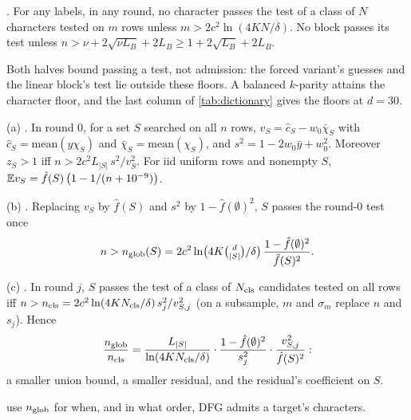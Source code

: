 \begin{proposition}\label{prop:floor}
. For any labels, in any round, no character passes the test of a class of $N$ characters tested on $m$ rows unless $m>2c^2\ln(4KN/\delta)$. No block passes its test unless $n>\nu+2\sqrt{\nu L_B}+2L_B\ge1+2\sqrt{L_B}+2L_B$.
\end{proposition}
Both halves bound passing a test, not admission: the forced variant's guesses and the linear block's test lie outside these floors. A balanced $k$-parity attains the character floor, and the last column of \cref{tab:dictionary} gives the floors at $d=30$.

\begin{proposition}\label{prop:nglob}
(a) . In round 0, for a set $S$ searched on all $n$ rows, $v_S=\hat c_S-w_0\bar\chi_S$ with $\hat c_S=\mathrm{mean}(y\chi_S)$ and $\bar\chi_S=\mathrm{mean}(\chi_S)$, and $s^2=1-2w_0\bar y+w_0^2$. Moreover $z_S>1$ iff $n>2c^2L_{|S|}\,s^2/v_S^2$. For iid uniform rows and nonempty $S$, $\mathbb{E} v_S=\hat f(S)\,\bigl(1-1/(n+10^{-9})\bigr)$.

(b) . Replacing $v_S$ by $\hat f(S)$ and $s^2$ by $1-\hat f(\emptyset)^2$, $S$ passes the round-0 test once
\begin{equation}\label{eq:nglob}
n>n_{\rm glob}(S)=2c^2\ln\bigl(4K\tbinom d{|S|}/\delta\bigr)\,\frac{1-\hat f(\emptyset)^2}{\hat f(S)^2}.
\end{equation}

(c) . In round $j$, $S$ passes the test of a class of $N_{\rm cls}$ candidates tested on all rows iff $n>n_{\rm cls}=2c^2\ln(4KN_{\rm cls}/\delta)\,s_j^2/v_{S,j}^2$ (on a subsample, $m$ and $\sigma_m$ replace $n$ and $s_j$). Hence
\[
\frac{n_{\rm glob}}{n_{\rm cls}}=\frac{L_{|S|}}{\ln(4KN_{\rm cls}/\delta)}\cdot\frac{1-\hat f(\emptyset)^2}{s_j^2}\cdot\frac{v_{S,j}^2}{\hat f(S)^2}:
\]
a smaller union bound, a smaller residual, and the residual's coefficient on $S$.
\end{proposition}
 use $n_{\rm glob}$ for when, and in what order, DFG admits a target's characters.

